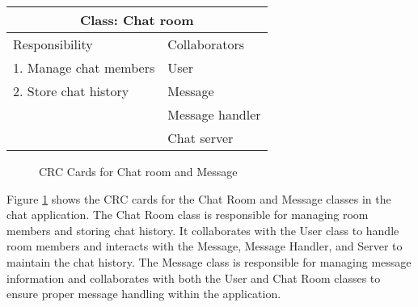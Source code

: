 \begin{table}[h!]
    \centering
    \begin{tabular}{ |p{6cm}||p{6cm}|  }
        \hline
        \multicolumn{2}{|c|}{Class: Chat room}   \\
        \hline
        Responsibility         & Collaborators   \\
        \hline
        1. Manage chat members & User            \\
        2. Store chat history  & Message         \\
                               & Message handler \\
                               & Chat server     \\
        \hline
    \end{tabular}
    
\end{table}
\begin{figure}[h]\centering\caption{CRC Cards for Chat room and Message
    }\label{CRC cards}\end{figure}

Figure \ref{CRC cards} shows the CRC cards for the Chat Room and Message classes in the chat application. The Chat Room class is responsible for managing room members and storing chat history. It collaborates with the User class to handle room members and interacts with the Message, Message Handler, and Server to maintain the chat history. The Message class is responsible for managing message information and collaborates with both the User and Chat Room classes to ensure proper message handling within the application.
